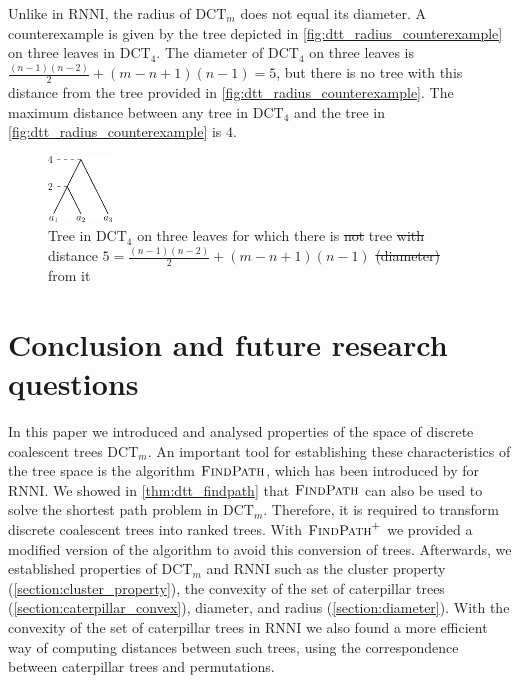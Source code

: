 \documentclass[11pt]{amsart}
\newcommand{\rnni}{\mathrm{RNNI}}
\newcommand{\findpath}{\textsc{FindPath}}
\newcommand{\dct}{\mathrm{DCT}}
\newcommand{\summary}[1]{} %
\providecommand{\DIFaddtex}[1]{{\protect\color{blue}\uwave{#1}}} %
\providecommand{\DIFdeltex}[1]{{\protect\color{red}\sout{#1}}}                      %
\providecommand{\DIFaddFL}[1]{\DIFadd{#1}} %
\providecommand{\DIFdelFL}[1]{\DIFdel{#1}} %
\providecommand{\DIFaddbeginFL}{} %
\providecommand{\DIFaddendFL}{} %
\providecommand{\DIFdelbeginFL}{} %
\providecommand{\DIFdelendFL}{} %
\providecommand{\DIFadd}[1]{\texorpdfstring{\DIFaddtex{#1}}{#1}} %
\providecommand{\DIFdel}[1]{\texorpdfstring{\DIFdeltex{#1}}{}} %
\newcommand{\DIFscaledelfig}{0.5}
\newlength{\DIFdelgraphicswidth} %
\newlength{\DIFdelgraphicsheight} %
\newcommand{\DIFaddincludegraphics}[2][]{{\color{blue}\fbox{\DIFOincludegraphics[#1]{#2}}}} %
\newcommand{\DIFdelincludegraphics}[2][]{%
\sbox{\DIFdelgraphicsbox}{\DIFOincludegraphics[#1]{#2}}%
\settoboxwidth{\DIFdelgraphicswidth}{\DIFdelgraphicsbox} %
\settoboxtotalheight{\DIFdelgraphicsheight}{\DIFdelgraphicsbox} %
\scalebox{\DIFscaledelfig}{%
\parbox[b]{\DIFdelgraphicswidth}{\usebox{\DIFdelgraphicsbox}\\[-\baselineskip] \rule{\DIFdelgraphicswidth}{0em}}\llap{\resizebox{\DIFdelgraphicswidth}{\DIFdelgraphicsheight}{%
\setlength{\unitlength}{\DIFdelgraphicswidth}%
\begin{picture}(1,1)%
\thicklines\linethickness{2pt} %
{\color[rgb]{1,0,0}\put(0,0){\framebox(1,1){}}}%
{\color[rgb]{1,0,0}\put(0,0){\line( 1,1){1}}}%
{\color[rgb]{1,0,0}\put(0,1){\line(1,-1){1}}}%
\end{picture}%
}\hspace*{3pt}}} %
} %
\DeclareRobustCommand{\DIFaddbeginFL}{\DIFOaddbeginFL \let\includegraphics\DIFaddincludegraphics} %
\DeclareRobustCommand{\DIFaddendFL}{\DIFOaddendFL \let\includegraphics\DIFOincludegraphics} %
\DeclareRobustCommand{\DIFdelbeginFL}{\DIFOdelbeginFL \let\includegraphics\DIFdelincludegraphics} %
\DeclareRobustCommand{\DIFdelendFL}{\DIFOaddendFL \let\includegraphics\DIFOincludegraphics} %
\begin{document}
Unlike in $\rnni$, the radius of $\dct_m$ does not equal its diameter.
A counterexample is given by the tree depicted in \autoref{fig:dtt_radius_counterexample} on three leaves in $\dct_4$.
The diameter of $\dct_4$ on three leaves is $\frac{(n-1)(n-2)}{2} + (m-n+1)(n-1) = 5$, but there is no tree with this distance from the tree provided in \autoref{fig:dtt_radius_counterexample}.
The maximum distance between any tree in $\dct_4$ and the tree in \autoref{fig:dtt_radius_counterexample} is $4$.

\begin{figure}[ht]
	\includegraphics[width=0.15\textwidth]{dtt_radius_counterexample.eps}
	\caption{Tree in $\dct_4$ on three leaves for which there is \DIFdelbeginFL \DIFdelFL{not }\DIFdelendFL \DIFaddbeginFL \DIFaddFL{no }\DIFaddendFL tree \DIFdelbeginFL \DIFdelFL{with }\DIFdelendFL \DIFaddbeginFL \DIFaddFL{at the diameter }\DIFaddendFL distance $5 = \frac{(n-1)(n-2)}{2} + (m-n+1)(n-1)$ \DIFdelbeginFL \DIFdelFL{(diameter) }\DIFdelendFL from it\DIFaddbeginFL \DIFaddFL{.}\DIFaddendFL }
	\label{fig:dtt_radius_counterexample}
\end{figure}


\section{Conclusion and future research questions}
\label{section:open_problems}

\summary{Brief summary of results of the paper}
In this paper we introduced and analysed properties of the space of discrete coalescent trees $\dct_m$.
An important tool for establishing these characteristics of the tree space is the algorithm $\findpath$, which has been introduced by \textcite{Collienne2021} for $\rnni$.
We showed in \autoref{thm:dtt_findpath} that $\findpath$ can also be used to solve the shortest path problem in $\dct_m$.
Therefore, it is required to transform discrete coalescent trees into ranked trees.
With $\findpath^+$ we provided a modified version of the algorithm to avoid this conversion of trees.
Afterwards, we established properties of $\dct_m$ and $\rnni$ such as the cluster property (\autoref{section:cluster_property}), the convexity of the set of caterpillar trees (\autoref{section:caterpillar_convex}), diameter, and radius (\autoref{section:diameter}).
With the convexity of the set of caterpillar trees in $\rnni$ we also found a more efficient way of computing distances between such trees, using the correspondence between caterpillar trees and permutations.
\end{document}
